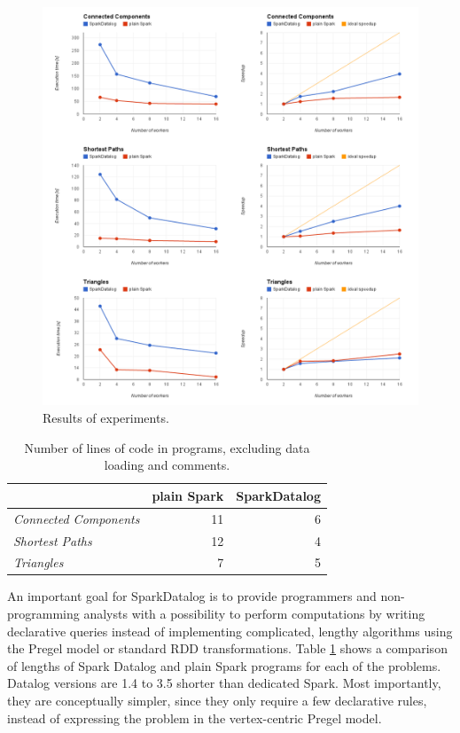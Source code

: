 \begin{figure}[!htbp]
  \centering
    \includegraphics[width=\textwidth]{images/plots_all.png}
   \caption{Results of experiments. \label{img_plots_exp}}
\end{figure}


\begin{table}[!htbp]
  \centering
\begin{tabular}{|l|r|r|}
\hline   & \textbf{plain Spark} & \textbf{SparkDatalog} \\ 
\hline
 \textit{Connected Components} & 11 & 6 \\ 
 \textit{Shortest Paths} & 12 & 4 \\ 
 \textit{Triangles} & 7 & 5 \\ 
\hline 
\end{tabular} 
\caption{Number of lines of code in programs, excluding data loading and comments.}
\label{tab_proglen}
\end{table}

An important goal for SparkDatalog is to provide programmers and non-programming analysts with a possibility to perform computations by writing declarative queries instead of implementing complicated, lengthy algorithms using the Pregel model or standard RDD transformations. Table \ref{tab_proglen} shows a comparison of lengths of Spark Datalog and plain Spark programs for each of the problems. Datalog versions are 1.4 to 3.5 shorter than dedicated Spark. Most importantly, they are conceptually simpler, since they only require a few declarative rules, instead of expressing the problem in the vertex-centric Pregel model.

